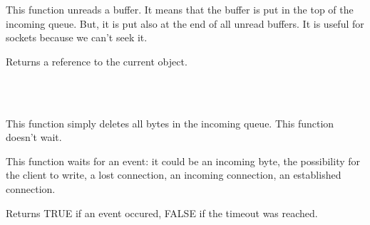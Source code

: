 %
%
\label{wxsocketbaseunread}


This function unreads a buffer. It means that the buffer is put in the top
of the incoming queue. But, it is put also at the end of all unread buffers.
It is useful for sockets because we can't seek it.





Returns a reference to the current object.


\\
\\

%
%
\label{wxsocketbasediscard}


This function simply deletes all bytes in the incoming queue. This function
doesn't wait.

\label{wxsocketbasewait}


This function waits for an event: it could be an incoming byte, the possibility
for the client to write, a lost connection, an incoming connection, an
established connection.





Returns TRUE if an event occured, FALSE if the timeout was reached.

